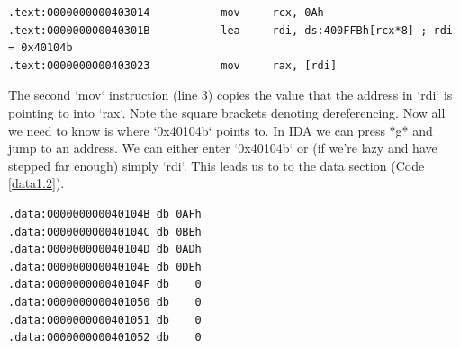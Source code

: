 \begin{lstlisting}[language={[x86masm]Assembler},name={excerpt of relevant instructions task 1.2},label={excerpt1.2}]
.text:0000000000403014           mov     rcx, 0Ah
.text:000000000040301B           lea     rdi, ds:400FFBh[rcx*8] ; rdi = 0x40104b
.text:0000000000403023           mov     rax, [rdi]
\end{lstlisting}
\begin{markdown}

The second `mov` instruction (line 3) copies the value that the address in `rdi` is pointing to into `rax`. Note the square brackets denoting dereferencing. Now all we need to know is where `0x40104b` points to.
\n
In IDA we can press *g* and jump to an address. We can either enter `0x40104b` or (if we're lazy and have stepped far enough) simply `rdi`. This leads us to to the data section (Code \ref{data1.2}).

\end{markdown}
\begin{lstlisting}[language={[x86masm]Assembler},name={excerpt of relevant data section task 1.2},label={data1.2}]
.data:000000000040104B db 0AFh
.data:000000000040104C db 0BEh
.data:000000000040104D db 0ADh
.data:000000000040104E db 0DEh
.data:000000000040104F db    0
.data:0000000000401050 db    0
.data:0000000000401051 db    0
.data:0000000000401052 db    0
\end{lstlisting}
